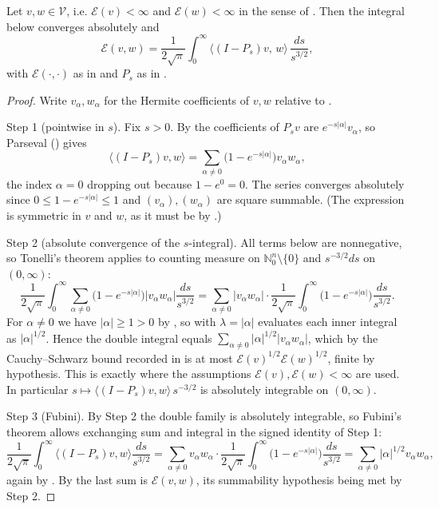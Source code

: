\begin{lemma}
Let $v, w \in \mathcal{V}$, i.e. $\mathcal{E}(v) < \infty$ and
$\mathcal{E}(w) < \infty$ in the sense of .  Then the integral
below converges absolutely and
\[
  \mathcal{E}(v, w)
    = \frac{1}{2\sqrt\pi}\int_0^\infty
        \bigl\langle (I-P_s)v,\, w\bigr\rangle\, \frac{ds}{s^{3/2}} ,
\]
with $\mathcal{E}(\cdot,\cdot)$ as in  and $P_s$ as in
.
\end{lemma}
\begin{proof}
Write $v_\alpha, w_\alpha$ for the Hermite coefficients of $v, w$ relative to
.

Step 1 (pointwise in $s$).  Fix $s > 0$.  By  the
coefficients of $P_s v$ are $e^{-s|\alpha|}v_\alpha$, so Parseval
() gives
\[
  \bigl\langle (I-P_s)v, w\bigr\rangle
    = \sum_{\alpha \neq 0}\bigl(1-e^{-s|\alpha|}\bigr) v_\alpha w_\alpha ,
\]
the index $\alpha = 0$ dropping out because $1 - e^{0} = 0$.  The series converges
absolutely since $0 \leq 1-e^{-s|\alpha|}\leq1$ and $(v_\alpha), (w_\alpha)$ are
square summable.  (The expression is symmetric in $v$ and $w$, as it must be by
.)

Step 2 (absolute convergence of the $s$-integral).  All terms below are
nonnegative, so Tonelli's theorem applies to counting measure on
$\mathbb{N}_0^n\setminus\{0\}$ and $s^{-3/2}ds$ on $(0,\infty)$:
\[
  \frac{1}{2\sqrt\pi}\int_0^\infty
    \sum_{\alpha\neq0}\bigl(1-e^{-s|\alpha|}\bigr)|v_\alpha w_\alpha|
      \frac{ds}{s^{3/2}}
  = \sum_{\alpha\neq0}|v_\alpha w_\alpha| \cdot
    \frac{1}{2\sqrt\pi}\int_0^\infty\bigl(1-e^{-s|\alpha|}\bigr)\frac{ds}{s^{3/2}} .
\]
For $\alpha \neq 0$ we have $|\alpha| \geq 1 > 0$ by , so
 with $\lambda = |\alpha|$ evaluates each inner integral
as $|\alpha|^{1/2}$.  Hence the double integral equals
$\sum_{\alpha\neq0}|\alpha|^{1/2}|v_\alpha w_\alpha|$, which by the
Cauchy--Schwarz bound recorded in  is at most
$\mathcal{E}(v)^{1/2}\mathcal{E}(w)^{1/2}$, finite by hypothesis.  This is exactly
where the assumptions $\mathcal{E}(v), \mathcal{E}(w) < \infty$ are used.  In
particular $s \mapsto \langle(I-P_s)v,w\rangle\, s^{-3/2}$ is absolutely
integrable on $(0,\infty)$.

Step 3 (Fubini).  By Step 2 the double family is absolutely integrable, so
Fubini's theorem allows exchanging sum and integral in the signed identity of
Step 1:
\[
  \frac{1}{2\sqrt\pi}\int_0^\infty\langle(I-P_s)v,w\rangle\frac{ds}{s^{3/2}}
    = \sum_{\alpha\neq0} v_\alpha w_\alpha \cdot
      \frac{1}{2\sqrt\pi}\int_0^\infty\bigl(1-e^{-s|\alpha|}\bigr)\frac{ds}{s^{3/2}}
    = \sum_{\alpha\neq0}|\alpha|^{1/2}v_\alpha w_\alpha ,
\]
again by .  By  the last sum is
$\mathcal{E}(v,w)$, its summability hypothesis being met by Step 2.
\end{proof}

